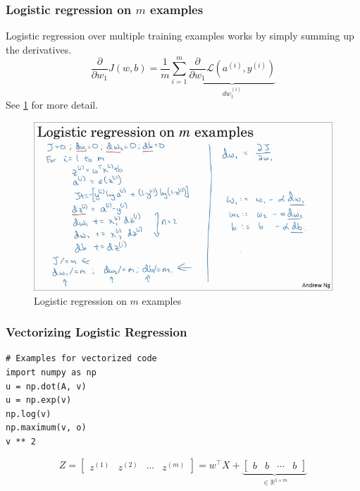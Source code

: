 \documentclass{article}
\begin{document}
\subsubsection{Logistic regression on $m$ examples}
Logistic regression over multiple training examples works by simply summing up the derivatives.
\begin{equation}
  \frac{\partial}{\partial w_1}J(w,b)=\frac{1}{m}\sum_{i=1}^m\underbrace{\frac{\partial}{\partial w_1}\mathcal{L}(a^{(i)},y^{(i)})}_{dw_1^{(i)}}
\end{equation}
See \cref{fig:logistic-regression} for more detail.
\begin{figure}[htbp]
  \begin{center}
    \includegraphics[width=\textwidth]{logistic-regression}
    \caption{Logistic regression on $m$ examples}
    \label{fig:logistic-regression}
  \end{center}
\end{figure}

\subsubsection{Vectorizing Logistic Regression}
\begin{verbatim}
# Examples for vectorized code
import numpy as np
u = np.dot(A, v)
u = np.exp(v)
np.log(v)
np.maximum(v, o)
v ** 2
\end{verbatim}

\begin{equation}
  Z=\begin{bmatrix}z^{(1)} & z^{(2)} & \cdots & z^{(m)}\end{bmatrix}=
    w^\top X + \underbrace{\begin{bmatrix}b & b & \cdots & b\end{bmatrix}}_{\in\mathbb{R}^{1\times m}}
\end{equation}
\end{document}
